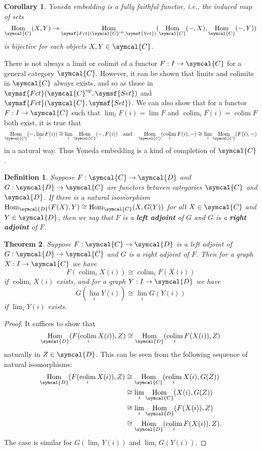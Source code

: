 \documentclass{article}
\theoremstyle{theorem}
\newtheorem{theorem}{Theorem}[section]
\newtheorem{corollary}[theorem]{Corollary}
\newtheorem{definition}{Definition}[section]
\theoremstyle{remark}
\def\calC{{\symcal{C}}}
\def\calD{{\symcal{D}}}
\DeclareMathOperator{\Hom}{Hom}
\DeclareMathOperator{\op}{op}
\DeclareMathOperator*{\colim}{colim}
\begin{document}
\begin{corollary}
    Yoneda embedding is a fully faithful functor, i.e., the induced map of sets $$\Hom_\calC(X, Y) \to \Hom_{\symsf{Fct}(\calC^{\op}, \symsf{Set})}(\Hom_\calC(-, X), \Hom_\calC(-, Y))$$ is bijective for each objects $X, Y \in \calC$. 
\end{corollary}

There is not always a limit or colimit of a functor $F : I \to \calC$ for a general category $\calC$. However, it can be shown that limits and colimits in $\calC$ always exists, and so as those in $\symsf{Fct}(\calC^{\op}, \symsf{Set})$ and $\symsf{Fct}(\calC, \symsf{Set})$. We can also show that for a functor $F : I \to \calC$ such that $\lim_i F(i) = \lim F$ and $\colim_i F(i) = \colim F$ both exist, it is true that $$\Hom_\calC(-, \lim_i F(i)) \cong \lim_i \Hom_\calC(-, F(i)) \quad \text{and} \quad \Hom_\calC(\colim_i F(i), -) \cong \lim_i \Hom_\calC(F(i), -)$$ in a natural way. Thus Yoneda embedding is a kind of completion of $\calC$. 

\begin{definition}
    Suppose $F : \calC \to \calD$ and $G : \calD \to \calC$ are functors between categories $\calC$ and $\calD$. If there is a natural isomorphism $\Hom_\calD(F(X), Y) \cong \Hom_\calC(X, G(Y))$ for all $X \in \calC$ and $Y \in \calD$, then we say that $F$ is a \textbf{left adjoint} of $G$ and $G$ is a \textbf{right adjoint} of $F$. 
\end{definition}

\begin{theorem}
    Suppose $F : \calC \to \calD$ is a left adjoint of $G : \calD \to \calC$ and $G$ is a right adjoint of $F$. Then for a graph $X : I \to \calC$ we have $$F(\colim_i X(i)) \cong \colim_i F(X(i))$$ if $\colim_i X(i)$ exists, and for a graph $Y : I \to \calD$ we have $$G(\lim_i Y(i)) \cong \lim_i G(Y(i))$$ if $\lim_i Y(i)$ exists. 
\end{theorem}
\begin{proof}
    It suffices to show that $$\Hom_\calD(F(\colim_i X(i)), Z) \cong \Hom_\calD(\colim_i F(X(i)), Z)$$ naturally in $Z \in \calD$. This can be seen from the following sequence of natural isomorphisms:
    \begin{align*}
        \Hom_\calD(F(\colim_i X(i)), Z) &\cong \Hom_\calC(\colim_i X(i), G(Z)) \\ 
        &\cong \lim_i \Hom_\calC(X(i), G(Z)) \\
        &\cong \lim_i \Hom_\calD(F(X(i)), Z) \\
        &\cong \Hom_\calD(\colim_i F(X(i)), Z).
    \end{align*}
    The case is similar for $G(\lim_i Y(i))$ and $\lim_i G(Y(i))$. 
\end{proof}
\end{document}
